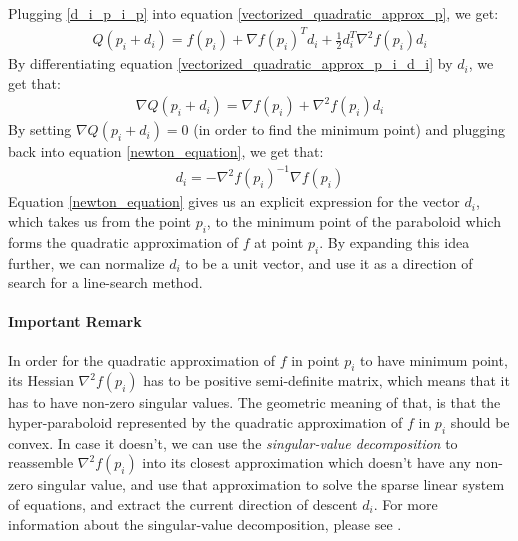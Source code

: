 Plugging \ref{d_i_p_i_p} into equation \ref{vectorized_quadratic_approx_p}, we get:
\begin{equation}\label{vectorized_quadratic_approx_p_i_d_i}
\begin{split}
Q\left(p_i + d_i\right) = f\left(p_i\right) + \nabla f\left(p_i\right)^Td_i + \frac{1}{2}d_i^T\nabla^2 f\left(p_i\right)d_i
\end{split}
\end{equation}
By differentiating equation \ref{vectorized_quadratic_approx_p_i_d_i} by $d_i$, we get that:
\begin{equation}\label{newton_equation}
\begin{split}
\nabla Q\left(p_i + d_i\right) = \nabla f\left(p_i\right) + \nabla^2 f\left(p_i\right)d_i
\end{split}
\end{equation}
By setting $\nabla Q\left(p_i + d_i\right) = 0$ (in order to find the minimum point) and plugging back into equation \ref{newton_equation}, we get that:
\begin{equation}\label{newton_equation}
\begin{split}
d_i = -\nabla^2 f\left(p_i\right)^{-1} \nabla f\left(p_i\right)
\end{split}
\end{equation}
Equation \ref{newton_equation} gives us an explicit expression for the vector $d_i$, which takes us from the point $p_i$, to the minimum point of the paraboloid which forms the quadratic approximation of $f$ at point $p_i$. By expanding this idea further, we can normalize $d_i$ to be a unit vector, and use it as a direction of search for a line-search method.
\paragraph{Important Remark} In order for the quadratic approximation of $f$ in point $p_i$ to have minimum point, its Hessian $\nabla^2 f\left(p_i\right)$ has to be positive semi-definite matrix, which means that it has to have non-zero singular values. The geometric meaning of that, is that the hyper-paraboloid represented by the quadratic approximation of $f$ in $p_i$ should be convex. In case it doesn't, we can use the \emph{singular-value decomposition} to reassemble $\nabla^2 f\left(p_i\right)$ into its closest approximation which doesn't have any non-zero singular value, and use that approximation to solve the sparse linear system of equations, and extract the current direction of descent $d_i$. For more information about the singular-value decomposition, please see \cite{strang2006linear}.

